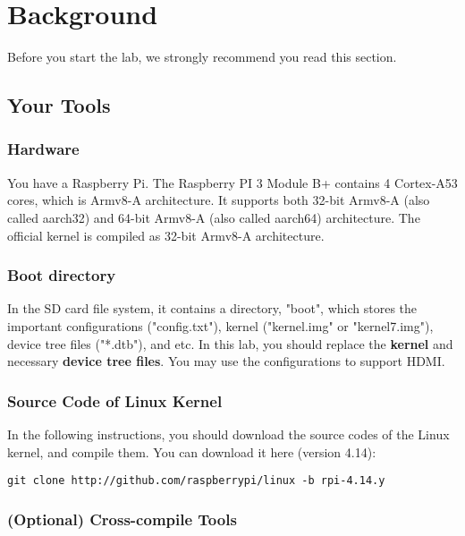 \section{Background}
\label{sec:background}

Before you start the lab, we strongly recommend you read this section. 

\subsection{Your Tools}


\subsubsection{Hardware}

You have a Raspberry Pi.
The Raspberry PI 3 Module B+ contains 4 Cortex-A53 cores, which is Armv8-A architecture.
It supports both 32-bit Armv8-A (also called aarch32) and 64-bit Armv8-A (also called aarch64) architecture.
The official kernel is compiled as 32-bit Armv8-A architecture.

\subsubsection{Boot directory}

In the SD card file system, it contains a directory, "boot", which stores the important configurations ("config.txt"), kernel ("kernel.img" or "kernel7.img"), device tree files ("*.dtb"), and etc.
In this lab, you should replace the \textbf{kernel} and necessary \textbf{device tree files}. You may use the configurations to support HDMI.

\subsubsection{Source Code of Linux Kernel}

In the following instructions, you should download the source codes of the Linux kernel, and compile them.
You can download it here (version 4.14):

\begin{lstlisting}
git clone http://github.com/raspberrypi/linux -b rpi-4.14.y
\end{lstlisting}

\subsubsection{(Optional) Cross-compile Tools}

